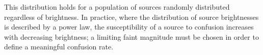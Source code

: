 \documentclass[a4paper,useAMS,usenatbib]{mn2e}
\begin{document}
This distribution holds for a population of sources randomly distributed regardless of brightness. In practice, where the distribution of source
brightnesses is described by a power law, the susceptibility of a source to
confusion increases with decreasing brightness; a limiting faint magnitude must
be chosen in order to define a meaningful confusion rate.



\end{document}
